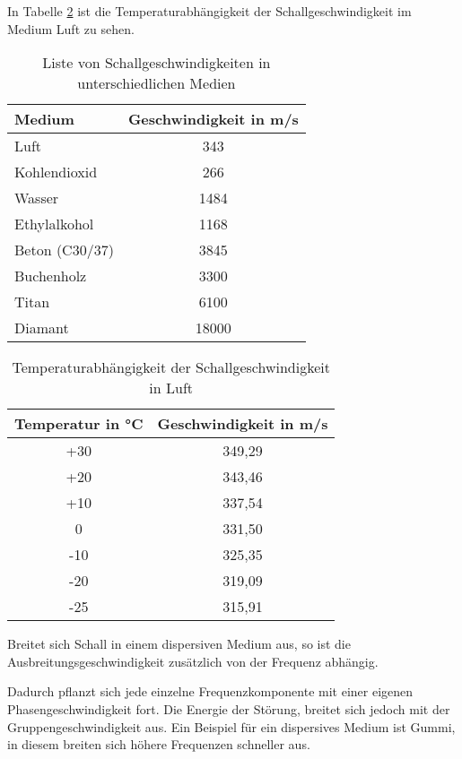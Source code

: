In Tabelle \ref{tab:UltraschallTemp} ist die Temperaturabhängigkeit der Schallgeschwindigkeit im Medium Luft zu sehen.

\begin{table}[h]
\caption{Liste von Schallgeschwindigkeiten in unterschiedlichen Medien}
\label{tab:UltraschallSpeed}
\centering
\setlength{\tabcolsep}{5mm}	%
\def\arraystretch{1.25}			%
\begin{tabular}{lc} 
Medium & Geschwindigkeit in m/s\\ 
\hline
Luft & 343\\ 
Kohlendioxid & 266\\
Wasser & 1484\\
Ethylalkohol & 1168\\
Beton (C30/37) & 3845\\
Buchenholz & 3300\\
Titan & 6100\\
Diamant & 18000\\
\end{tabular}
\end{table}

\begin{table}[h]
\caption{Temperaturabhängigkeit der Schallgeschwindigkeit in Luft}
\label{tab:UltraschallTemp}
\centering
\setlength{\tabcolsep}{5mm}	%
\def\arraystretch{1.25}			%
\begin{tabular}{cc} 
Temperatur in °C & Geschwindigkeit in m/s\\ 
\hline
+30 & 349,29\\
+20 & 343,46\\
+10 & 337,54\\
0 & 331,50\\
-10 & 325,35\\
-20 & 319,09\\
-25 & 315,91\\
\end{tabular}
\end{table}

Breitet sich Schall in einem dispersiven Medium aus, so ist die Ausbreitungsgeschwindigkeit zusätzlich von der Frequenz abhängig. 

Dadurch pflanzt sich jede einzelne Frequenzkomponente mit einer eigenen Phasengeschwindigkeit fort. Die Energie der Störung, breitet sich jedoch mit der Gruppengeschwindigkeit aus. Ein Beispiel für ein dispersives Medium ist Gummi, in diesem breiten sich höhere Frequenzen schneller aus.

